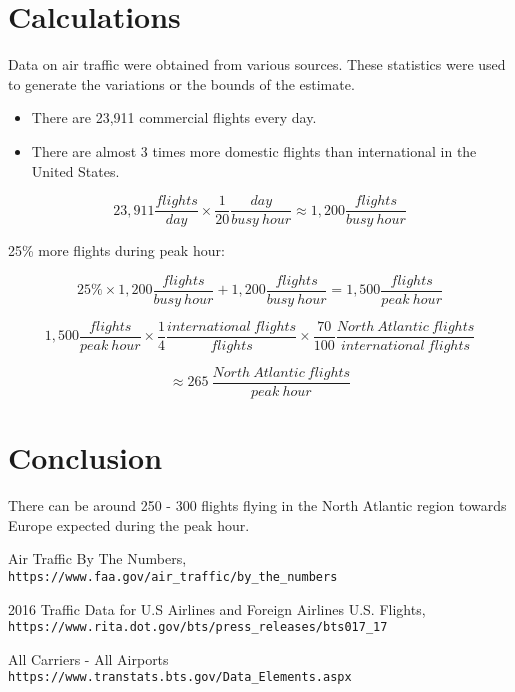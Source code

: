 \documentclass[11pt]{article}
\begin{document}
	\section{Calculations}
	Data on air traffic were obtained from various sources. These statistics were used to generate the variations or the bounds of the estimate.

		\begin{itemize}

			\item There are 23,911 commercial flights every day. \cite{faa}

			\item There are almost 3 times more domestic flights than international in the United States. \cite{domvsintl}

		\end{itemize}

		\[ 23,911 \frac{flights}{day} \times \frac{1}{20} \frac{day}{busy \ hour} \approx 1,200 \frac{flights}{busy \ hour} \]

		25\% more flights during peak hour:

		\[ 25\% \times 1,200 \frac{flights}{busy \ hour} + 1,200 \frac{flights}{busy \ hour} = 1,500 \frac{flights}{peak \ hour} \]

		\[ 1,500 \frac{flights}{peak \ hour} \times \frac{1}{4} \frac{international \ flights}{flights} \times \frac{70}{100} \frac{North \ Atlantic \ flights}{international \ flights} \]

		\[ \approx 265 \ \frac{North \ Atlantic \ flights}{peak \ hour} \]

	\section{Conclusion}
	There can be around 250 - 300 flights flying in the North Atlantic region towards Europe expected during the peak hour.


	\begin{thebibliography}{9}

		Air Traffic By The Numbers,
		\\\texttt{https://www.faa.gov/air\_{}traffic/by\_{}the\_{}numbers}

		2016 Traffic Data for U.S Airlines and Foreign Airlines U.S. Flights,
		\\\texttt{https://www.rita.dot.gov/bts/press\_{}releases/bts017\_{}17}

		All Carriers - All Airports
		\\\texttt{https://www.transtats.bts.gov/Data\_{}Elements.aspx}


	\end{thebibliography}
\end{document}
